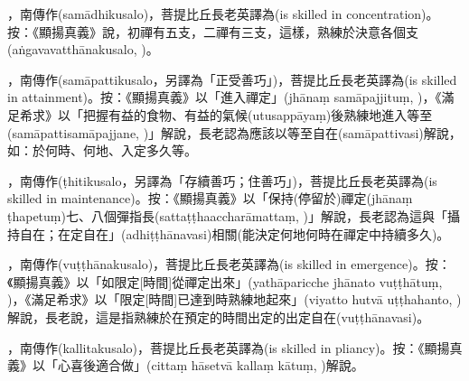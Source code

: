\startitemgroup[noteitems]
\item{}，南傳作(samādhikusalo)，菩提比丘長老英譯為(is skilled in concentration)。按：《顯揚真義》說，初禪有五支，二禪有三支，這樣，熟練於決意各個支(aṅgavavatthānakusalo, )。
\stopitemgroup

\startitemgroup[noteitems]
\item{}，南傳作(samāpattikusalo，另譯為「正受善巧」)，菩提比丘長老英譯為(is skilled in attainment)。按：《顯揚真義》以「進入禪定」(jhānaṃ samāpajjituṃ, )，《滿足希求》以「把握有益的食物、有益的氣候(utusappāyaṃ)後熟練地進入等至(samāpattisamāpajjane, )」解說，長老認為應該以等至自在(samāpattivasi)解說，如：於何時、何地、入定多久等。
\stopitemgroup

\startitemgroup[noteitems]
\item{}，南傳作(ṭhitikusalo，另譯為「存續善巧；住善巧」)，菩提比丘長老英譯為(is skilled in maintenance)。按：《顯揚真義》以「保持(停留於)禪定(jhānaṃ ṭhapetuṃ)七、八個彈指長(sattaṭṭhaaccharāmattaṃ, )」解說，長老認為這與「攝持自在；在定自在」(adhiṭṭhānavasi)相關(能決定何地何時在禪定中持續多久)。
\stopitemgroup

\startitemgroup[noteitems]
\item{}，南傳作(vuṭṭhānakusalo)，菩提比丘長老英譯為(is skilled in emergence)。按：《顯揚真義》以「如限定[時間]從禪定出來」(yathāparicche jhānato vuṭṭhātuṃ, )，《滿足希求》以「限定[時間]已達到時熟練地起來」(viyatto hutvā uṭṭhahanto, )解說，長老說，這是指熟練於在預定的時間出定的出定自在(vuṭṭhānavasi)。
\stopitemgroup

\startitemgroup[noteitems]
\item{}，南傳作(kallitakusalo)，菩提比丘長老英譯為(is skilled in pliancy)。按：《顯揚真義》以「心喜後適合做」(cittaṃ hāsetvā kallaṃ kātuṃ, )解說。
\stopitemgroup

